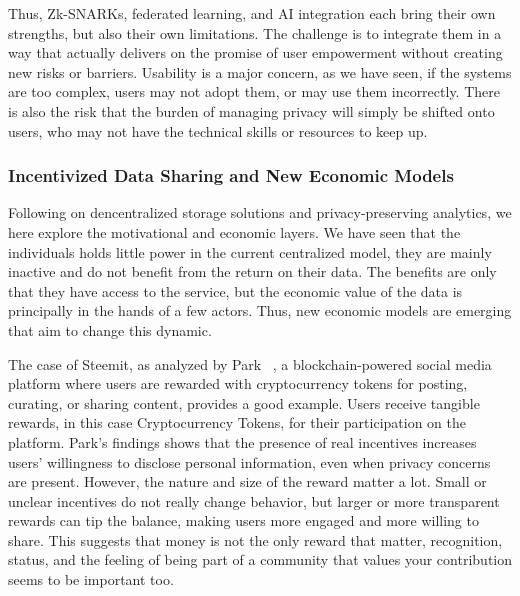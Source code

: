 	Thus, Zk-SNARKs, federated learning, and AI integration each bring their own strengths, but also their own limitations. The challenge is to integrate them in a way that actually delivers on the promise of user empowerment without creating new risks or barriers. Usability is a major concern, as we have seen, if the systems are too complex, users may not adopt them, or may use them incorrectly. There is also the risk that the burden of managing privacy will simply be shifted onto users, who may not have the technical skills or resources to keep up.
	\subsubsection{Incentivized Data Sharing and New Economic Models}

	Following on dencentralized storage solutions and privacy-preserving analytics, we here explore the motivational and economic layers.  We have seen that the individuals holds little power in the current centralized model, they are mainly inactive and do not benefit from the return on their data. The benefits are only that they have access to the service, but the economic value of the data is principally in the hands of a few actors. Thus, new economic models are emerging that aim to change this dynamic.

	The case of Steemit, as analyzed by Park ~\cite{Park2023}, a blockchain-powered social media platform where users are rewarded with cryptocurrency tokens for posting, curating, or sharing content, provides a good example. 
	Users receive tangible rewards, in this case Cryptocurrency Tokens, for their participation on the platform. Park’s findings shows that the presence of real incentives increases users’ willingness to disclose personal information, even when privacy concerns are present. However, the nature and size of the reward matter a lot. Small or unclear incentives do not really change behavior, but larger or more transparent rewards can tip the balance, making users more engaged and more willing to share. This suggests that money is not the only reward that matter, recognition, status, and the feeling of being part of a community that values your contribution seems to be important too.

